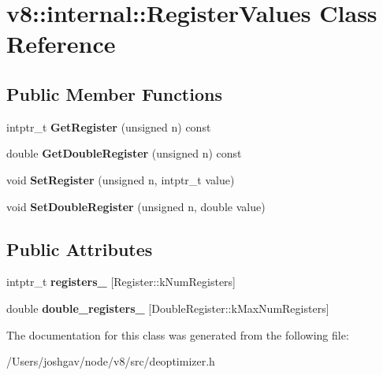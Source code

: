 \hypertarget{classv8_1_1internal_1_1_register_values}{}\section{v8\+:\+:internal\+:\+:Register\+Values Class Reference}
\label{classv8_1_1internal_1_1_register_values}
\subsection*{Public Member Functions}
\begin{DoxyCompactItemize}
\item 
intptr\+\_\+t {\bfseries Get\+Register} (unsigned n) const \hypertarget{classv8_1_1internal_1_1_register_values_a4192b31f5bb57ac2a96592f5e8a36170}{}\label{classv8_1_1internal_1_1_register_values_a4192b31f5bb57ac2a96592f5e8a36170}

\item 
double {\bfseries Get\+Double\+Register} (unsigned n) const \hypertarget{classv8_1_1internal_1_1_register_values_af3f78fc2230093ba15239ee73d8bec96}{}\label{classv8_1_1internal_1_1_register_values_af3f78fc2230093ba15239ee73d8bec96}

\item 
void {\bfseries Set\+Register} (unsigned n, intptr\+\_\+t value)\hypertarget{classv8_1_1internal_1_1_register_values_a3bbaf57efac5a4f0b735966a61f588ce}{}\label{classv8_1_1internal_1_1_register_values_a3bbaf57efac5a4f0b735966a61f588ce}

\item 
void {\bfseries Set\+Double\+Register} (unsigned n, double value)\hypertarget{classv8_1_1internal_1_1_register_values_a494b69b23a0c9763ef0612f45f07a88c}{}\label{classv8_1_1internal_1_1_register_values_a494b69b23a0c9763ef0612f45f07a88c}

\end{DoxyCompactItemize}
\subsection*{Public Attributes}
\begin{DoxyCompactItemize}
\item 
intptr\+\_\+t {\bfseries registers\+\_\+} \mbox{[}Register\+::k\+Num\+Registers\mbox{]}\hypertarget{classv8_1_1internal_1_1_register_values_abc424dd454f0303fdd1c4ada7474587b}{}\label{classv8_1_1internal_1_1_register_values_abc424dd454f0303fdd1c4ada7474587b}

\item 
double {\bfseries double\+\_\+registers\+\_\+} \mbox{[}Double\+Register\+::k\+Max\+Num\+Registers\mbox{]}\hypertarget{classv8_1_1internal_1_1_register_values_a3a94aa883497271127004b07d618fff1}{}\label{classv8_1_1internal_1_1_register_values_a3a94aa883497271127004b07d618fff1}

\end{DoxyCompactItemize}


The documentation for this class was generated from the following file\+:\begin{DoxyCompactItemize}
\item 
/\+Users/joshgav/node/v8/src/deoptimizer.\+h\end{DoxyCompactItemize}
